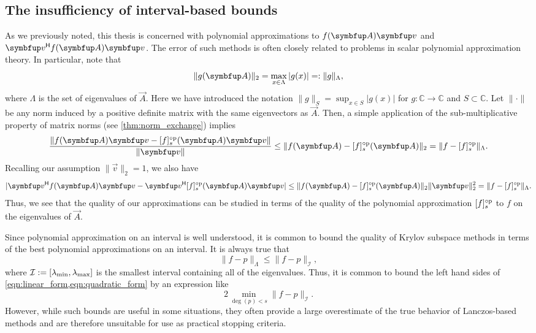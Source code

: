 \subsection{The insufficiency of interval-based bounds}
\label{sec:poly_insuff}

As we previously noted, this thesis is concerned with polynomial approximations to \( \fA \vec{v} \) and \( \vec{v}^\cT \fA \vec{v} \).
The error of such methods is often closely related to problems in scalar polynomial approximation theory.
In particular, note that 
\begin{equation*}
    \| g \A \|_2
    = \max_{x \in \Lambda} |g(x)|
    =: \| g \|_\Lambda, 
\end{equation*}
where \( \Lambda \) is the set of eigenvalues of \( \vec{A} \).
Here we have introduced the notation \( \|g\|_S = \sup_{x \in S}|g(x)| \) for \( g:\mathbb{C}\to\mathbb{C} \) and \( S\subset \mathbb{C} \). \label{def:norm_sup}
Let \( \| \cdot \| \) be any norm induced by a positive definite matrix with the same eigenvectors as \( \vec{A} \). \label{def:norm}
Then, a simple application of the sub-multiplicative property of matrix norms (see \cref{thm:norm_exchange}) implies 
\begin{equation}
    \label{eqn:linear_form}
    \frac{\| \fA \vec{v} -  \ff{f}{s}\mf{\vec{A}} \vec{v} \|}{\|\vec{v}\|} 
    \leq \| \fA - \ff{f}{s}\mf{\vec{A}}  \|_2  
   = \| f-\ff{f}{s} \|_{\Lambda}.
\end{equation}
Recalling our assumption \( \|\vec{v}\|_2 = 1 \), we also have
\begin{equation}
    \label{eqn:quadratic_form}
    | \vec{v}^\cT \fA \vec{v} - \vec{v}^\cT \ff{f}{s}\mf{\vec{A}} \vec{v} | 
    \leq \| \fA - \ff{f}{s}\mf{\vec{A}} \|_2 \| \vec{v} \|_2^2
    = \| f-\ff{f}{s} \|_{\Lambda}.
\end{equation}
Thus, we see that the quality of our approximations can be studied in terms of the quality of the polynomial approximation \( \ff{f}{s} \) to \( f \) on the eigenvalues of \( \vec{A} \).

Since polynomial approximation on an interval is well understood, it is common to bound the quality of Krylov subspace methods in terms of the best polynomial approximations on an interval.
It is always true that 
\begin{equation*}
    \| f-p \|_{\Lambda} \leq \| f-p \|_{\mathcal{I}},
\end{equation*}
where \( \mathcal{I} := [\lambda_{\textup{min}},\lambda_{\textup{max}}] \) is the smallest interval containing all of the eigenvalues.
Thus, it is common to bound the left hand sides of \cref{eqn:linear_form,eqn:quadratic_form} by an expression like
\begin{equation}
    \label{eqn:unif_bound}
    2 \min_{\deg(p) < s} \| f - p \|_{\mathcal{I}}.
\end{equation}
However, while such bounds are useful in some situations, they often provide a large overestimate of the true behavior of Lanczos-based methods and are therefore unsuitable for use as practical stopping criteria.

